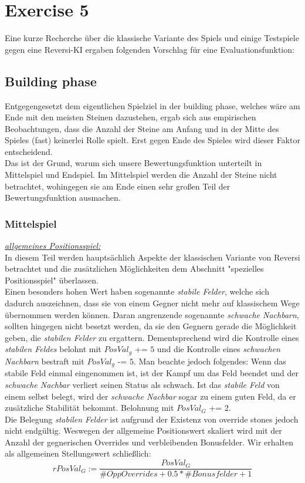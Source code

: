 \section{Exercise 5}
Eine kurze Recherche über die klassische Variante des Spiels und einige Testspiele gegen eine Reversi-KI ergaben folgenden Vorschlag für eine Evaluationsfunktion:
\subsection{Building phase}
Entgegengesetzt dem eigentlichen Spielziel in der building phase, welches wäre am Ende mit den meisten Steinen dazustehen, ergab sich aus empirischen Beobachtungen, dass die Anzahl der Steine am Anfang und in der Mitte des Spieles (fast) keinerlei Rolle spielt. Erst gegen Ende des Spieles wird dieser Faktor entscheidend.\\
Das ist der Grund, warum sich unsere Bewertungsfunktion unterteilt in Mittelspiel und  Endspiel. Im Mittelspiel werden die Anzahl der Steine nicht betrachtet, wohingegen sie am Ende einen sehr großen Teil der Bewertungsfunktion ausmachen.
\subsubsection{Mittelspiel}
\underline{\textit{allgemeines Positionsspiel:}}\\
In diesem Teil werden hauptsächlich Aspekte der klassischen Variante von Reversi betrachtet und die zusätzlichen Möglichkeiten dem Abschnitt "spezielles Positionsspiel" überlassen.\\
Einen besonders hohen Wert haben sogenannte \textit{stabile Felder}, welche sich dadurch auszeichnen, dass sie von einem Gegner nicht mehr auf klassischem Wege übernommen werden können. Daran angrenzende sogenannte \textit{schwache Nachbarn}, sollten hingegen nicht besetzt werden, da sie den Gegnern gerade die Möglichkeit geben, die \textit{stabilen Felder} zu ergattern. Dementsprechend wird die Kontrolle eines \textit{stabilen Feldes} belohnt mit $PosVal_g$ += $5$ und die Kontrolle eines \textit{schwachen Nachbarn} bestraft mit $PosVal_g$ -= $5$. Man beachte jedoch folgendes: Wenn das stabile Feld einmal eingenommen ist, ist der Kampf um das Feld beendet und der \textit{schwache Nachbar} verliert seinen Status als schwach. Ist das \textit{stabile Feld} von einem selbst belegt, wird der \textit{schwache Nachbar} sogar zu einem guten Feld, da er zusätzliche Stabilität bekommt. Belohnung mit $PosVal_G$ += $2$.\\
Die Belegung \textit{stabilen Felder} ist aufgrund der Existenz von override stones jedoch nicht endgültig. Weswegen der allgemeine Positionswert skaliert wird mit der Anzahl der gegnerischen Overrides und verbleibenden Bonusfelder. Wir erhalten als allgemeinen Stellungswert schließlich:
$$rPosVal_G := \dfrac{PosVal_G}{\#OppOverrides + 0.5*\#Bonusfelder + 1}$$\\

